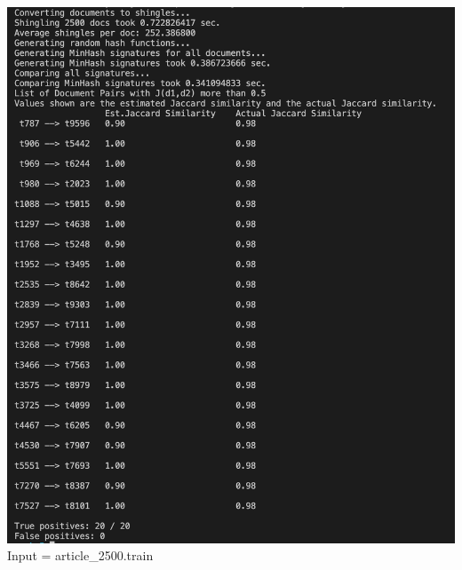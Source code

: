 \documentclass[9pt,twoside]{exam}
\begin{document}
\begin{center}
\includegraphics[scale=0.7]{2500.png}\\
Input = article\_2500.train \\


\end{center}
\end{document}

